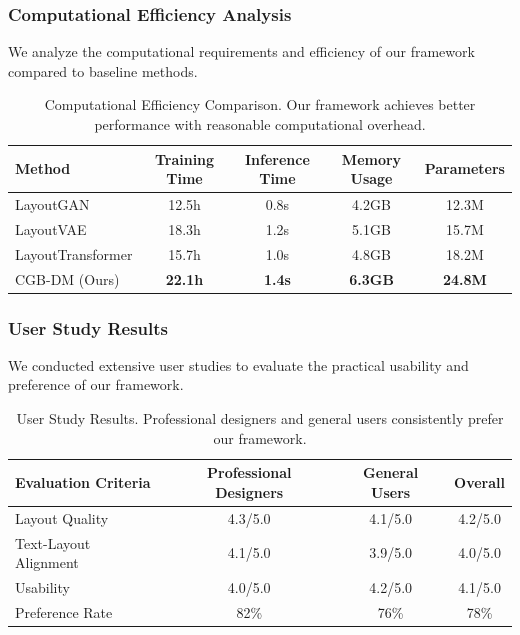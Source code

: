 \documentclass[journal,article,submit,pdftex,moreauthors]{Definitions/mdpi}
\begin{document}
\subsubsection{Computational Efficiency Analysis}

We analyze the computational requirements and efficiency of our framework compared to baseline methods.

\begin{table}[H]
\caption{Computational Efficiency Comparison. Our framework achieves better performance with reasonable computational overhead.\label{tab:efficiency}}
\begin{tabularx}{\textwidth}{lcccc}
\toprule
\textbf{Method} & \textbf{Training Time} & \textbf{Inference Time} & \textbf{Memory Usage} & \textbf{Parameters}\\
\midrule
LayoutGAN & 12.5h & 0.8s & 4.2GB & 12.3M\\
LayoutVAE & 18.3h & 1.2s & 5.1GB & 15.7M\\
LayoutTransformer & 15.7h & 1.0s & 4.8GB & 18.2M\\
CGB-DM (Ours) & \textbf{22.1h} & \textbf{1.4s} & \textbf{6.3GB} & \textbf{24.8M}\\
\bottomrule
\end{tabularx}
\end{table}

\subsubsection{User Study Results}

We conducted extensive user studies to evaluate the practical usability and preference of our framework.

\begin{table}[H]
\caption{User Study Results. Professional designers and general users consistently prefer our framework.\label{tab:user_study}}
\begin{tabularx}{\textwidth}{lccc}
\toprule
\textbf{Evaluation Criteria} & \textbf{Professional Designers} & \textbf{General Users} & \textbf{Overall}\\
\midrule
Layout Quality & 4.3/5.0 & 4.1/5.0 & 4.2/5.0\\
Text-Layout Alignment & 4.1/5.0 & 3.9/5.0 & 4.0/5.0\\
Usability & 4.0/5.0 & 4.2/5.0 & 4.1/5.0\\
Preference Rate & 82\% & 76\% & 78\%\\
\bottomrule
\end{tabularx}
\end{table}
\end{document}
